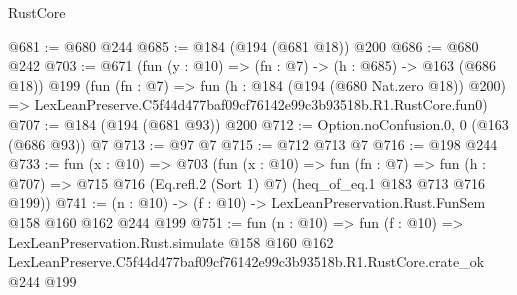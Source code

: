 \begin{lexlean}{RustCore}
\begin{coremodule}
@681 := @680 @244
@685 := @184 (@194 (@681 @18)) @200
@686 := @680 @242
@703 := @671
    (fun (y : @10) => (fn : @7) -> (h : @685) -> @163 (@686 @18))
    @199
    (fun (fn : @7) =>
    fun (h : @184 (@194 (@680 Nat.zero @18)) @200) =>
    LexLeanPreserve.C5f44d477baf09cf76142e99c3b93518b.R1.RustCore.fun0)
@707 := @184 (@194 (@681 @93)) @200
@712 := Option.noConfusion.{0, 0} (@163 (@686 @93)) @7
@713 := @97 @7
@715 := @712 @713 @7
@716 := @198 @244
@733 := fun (x : @10) =>
  @703
    (fun (x : @10) =>
    fun (fn : @7) =>
    fun (h : @707) => @715 @716 (Eq.refl.{2} (Sort 1) @7) (heq_of_eq.{1} @183 @713 @716 @199))
@741 := (n : @10) -> (f : @10) -> LexLeanPreservation.Rust.FunSem @158 @160 @162 @244 @199
@751 := fun (n : @10) =>
  fun (f : @10) =>
  LexLeanPreservation.Rust.simulate
    @158
    @160
    @162
    LexLeanPreserve.C5f44d477baf09cf76142e99c3b93518b.R1.RustCore.crate_ok
    @244
    @199
\end{coremodule}
\end{lexlean}
